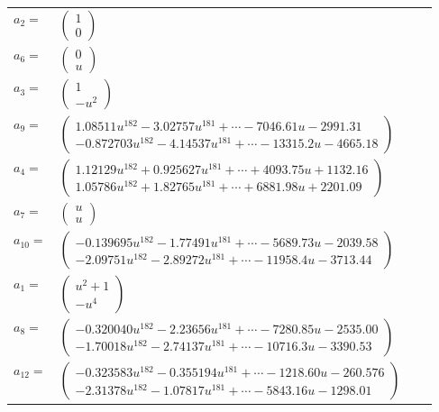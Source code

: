 \documentclass[1p]{elsarticle_modified}
\theoremstyle{definition}
\begin{document}
\begin{tabular}{m{7pt} m{180pt} m{7pt} m{180pt} }
\flushright $a_{2}=$&$\begin{pmatrix}1\\0\end{pmatrix}$ \\
\flushright $a_{6}=$&$\begin{pmatrix}0\\u\end{pmatrix}$ \\
\flushright $a_{3}=$&$\begin{pmatrix}1\\- u^2\end{pmatrix}$ \\
\flushright $a_{9}=$&$\begin{pmatrix}1.08511 u^{182}-3.02757 u^{181}+\cdots-7046.61 u-2991.31\\-0.872703 u^{182}-4.14537 u^{181}+\cdots-13315.2 u-4665.18\end{pmatrix}$ \\
\flushright $a_{4}=$&$\begin{pmatrix}1.12129 u^{182}+0.925627 u^{181}+\cdots+4093.75 u+1132.16\\1.05786 u^{182}+1.82765 u^{181}+\cdots+6881.98 u+2201.09\end{pmatrix}$ \\
\flushright $a_{7}=$&$\begin{pmatrix}u\\u\end{pmatrix}$ \\
\flushright $a_{10}=$&$\begin{pmatrix}-0.139695 u^{182}-1.77491 u^{181}+\cdots-5689.73 u-2039.58\\-2.09751 u^{182}-2.89272 u^{181}+\cdots-11958.4 u-3713.44\end{pmatrix}$ \\
\flushright $a_{1}=$&$\begin{pmatrix}u^2+1\\- u^4\end{pmatrix}$ \\
\flushright $a_{8}=$&$\begin{pmatrix}-0.320040 u^{182}-2.23656 u^{181}+\cdots-7280.85 u-2535.00\\-1.70018 u^{182}-2.74137 u^{181}+\cdots-10716.3 u-3390.53\end{pmatrix}$ \\
\flushright $a_{12}=$&$\begin{pmatrix}-0.323583 u^{182}-0.355194 u^{181}+\cdots-1218.60 u-260.576\\-2.31378 u^{182}-1.07817 u^{181}+\cdots-5843.16 u-1298.01\end{pmatrix}$ \\

\end{tabular}
\end{document}
